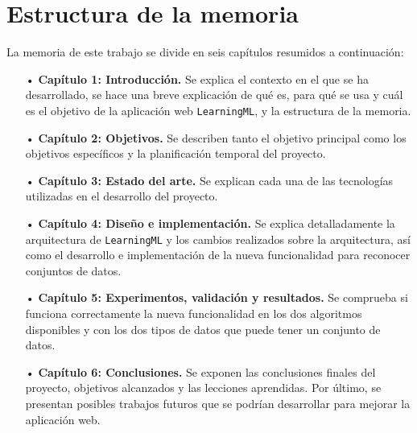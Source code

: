 \documentclass[a4paper, 12pt]{book}
\begin{document}
\section{Estructura de la memoria}
\label{sec:estructura}

La memoria de este trabajo se divide en seis capítulos resumidos a continuación:

\begin{itemize}
  \item[•] \textbf{Capítulo 1: Introducción.} Se explica el contexto en el que se ha desarrollado, se hace una breve explicación de qué es, para qué se usa y cuál es el objetivo de la aplicación web \texttt{LearningML}, y la estructura de la memoria.
  
  \item[•] \textbf{Capítulo 2: Objetivos.} Se describen tanto el objetivo principal como los objetivos específicos y la planificación temporal del proyecto.
  
  \item[•] \textbf{Capítulo 3: Estado del arte.} Se explican cada una de las tecnologías utilizadas en el desarrollo del proyecto.
  
  \item[•] \textbf{Capítulo 4: Diseño e implementación.} Se explica detalladamente la arquitectura de \texttt{LearningML} y los cambios realizados sobre la arquitectura, así como el desarrollo e implementación de la nueva funcionalidad para reconocer conjuntos de datos.
  
  \item[•] \textbf{Capítulo 5: Experimentos, validación y resultados.} Se comprueba si funciona correctamente la nueva funcionalidad en los dos algoritmos disponibles y con los dos tipos de datos que puede tener un conjunto de datos.
  
  \item[•] \textbf{Capítulo 6: Conclusiones.} Se exponen las conclusiones finales del proyecto, objetivos alcanzados y las lecciones aprendidas. Por último, se presentan posibles trabajos futuros que se podrían desarrollar para mejorar la aplicación web.
  
\end{itemize}



\end{document}
